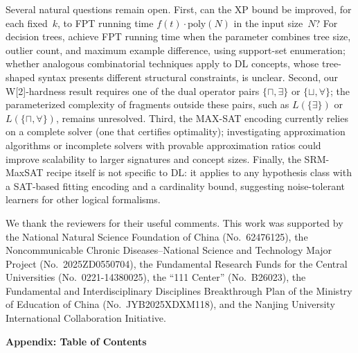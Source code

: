 \documentclass[accepted]{uai2026} %
\theoremstyle{definition}
\theoremstyle{remark}
\newcommand{\poly}{\mathrm{poly}}
\begin{document}
Several natural questions remain open.
First, can the XP bound be
improved, for each fixed~$k$, to FPT
running time $f(t) \cdot \poly(N)$ in the input size~$N$?
For decision trees, \citet{DBLP:conf/aaai/GahlawatZ24}
achieve FPT running time when the parameter combines tree size,
outlier count, and maximum example difference, using support-set
enumeration; whether analogous
combinatorial techniques apply to DL concepts,
whose tree-shaped
syntax presents different structural constraints, is unclear.
Second, our W[2]-hardness result requires one
of the dual operator pairs $\{\sqcap, \exists\}$ or
$\{\sqcup, \forall\}$; the parameterized complexity of fragments
outside these pairs, such as $L(\{\exists\})$ or
$L(\{\sqcap, \forall\})$, remains unresolved.
Third, the MAX-SAT encoding currently relies on a complete
solver (one that certifies optimality);
investigating approximation algorithms or incomplete
solvers with provable approximation ratios could improve
scalability to larger signatures and concept
sizes. Finally, the SRM-MaxSAT recipe itself is not specific to
DL: it applies to any hypothesis class with a SAT-based fitting
encoding and a cardinality bound, suggesting noise-tolerant
learners for other logical formalisms.

\begin{acknowledgements}
We thank the reviewers for their useful comments. This work was supported by the National Natural Science Foundation of China (No.~62476125), the Noncommunicable Chronic Diseases--National Science and Technology Major Project (No.~2025ZD0550704), the Fundamental Research Funds for the Central Universities (No.~0221-14380025), the ``111 Center'' (No.~B26023), the Fundamental and Interdisciplinary Disciplines Breakthrough Plan of the Ministry of Education of China (No.~JYB2025XDXM118), and the Nanjing University International Collaboration Initiative.
\end{acknowledgements}



\newpage

\onecolumn

\appendix

\thispagestyle{empty}

\vspace*{\fill}

\begin{center}
  {\LARGE\bfseries Appendix: Table of Contents}
\end{center}
\end{document}
